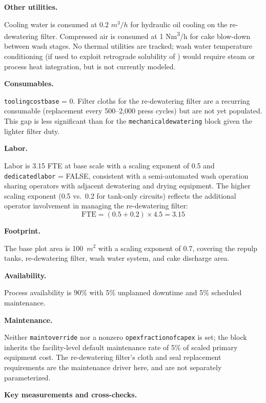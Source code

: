 \documentclass{article}
\renewcommand\_{\textunderscore\allowbreak}
\begin{document}
\medskip
\noindent\textbf{Other utilities.}\quad

Cooling water is consumed at 0.2 $\si{m^3/h}$ for hydraulic oil cooling on the re-dewatering filter. Compressed air is consumed at 1 \si{Nm^3/h} for cake blow-down between wash stages. No thermal utilities are tracked; wash water temperature conditioning (if used to exploit retrograde solubility of ) would require steam or process heat integration, but is not currently modeled.

\medskip
\noindent\textbf{Consumables.}\quad

\texttt{tooling\_cost\_base} = 0. Filter cloths for the re-dewatering filter are a recurring consumable (replacement every 500--2,000 press cycles) but are not yet populated. This gap is less significant than for the \texttt{mechanical\_dewatering} block given the lighter filter duty.

\medskip
\noindent\textbf{Labor.}\quad

Labor is 3.15 FTE at base scale with a scaling exponent of 0.5 and \texttt{dedicated\_labor} = FALSE, consistent with a semi-automated wash operation sharing operators with adjacent dewatering and drying equipment. The higher scaling exponent (0.5 vs.\ 0.2 for tank-only circuits) reflects the additional operator involvement in managing the re-dewatering filter:
\[
	\text{FTE} = (0.5 + 0.2) \times 4.5 = 3.15
\]

\medskip
\noindent\textbf{Footprint.}\quad

The base plot area is 100~$\si{m^2}$ with a scaling exponent of 0.7, covering the repulp tanks, re-dewatering filter, wash water system, and cake discharge area.

\medskip
\noindent\textbf{Availability.}\quad

Process availability is 90\% with 5\% unplanned downtime and 5\% scheduled maintenance.

\medskip
\noindent\textbf{Maintenance.}\quad

Neither \texttt{maint\_override} nor a nonzero \texttt{opex\_fraction\_of\_capex} is set; the block inherits the facility-level default maintenance rate of 5\% of scaled primary equipment cost. The re-dewatering filter's cloth and seal replacement requirements are the maintenance driver here, and are not separately parameterized.

\medskip
\noindent\textbf{Key measurements and cross-checks.}\quad
\end{document}
